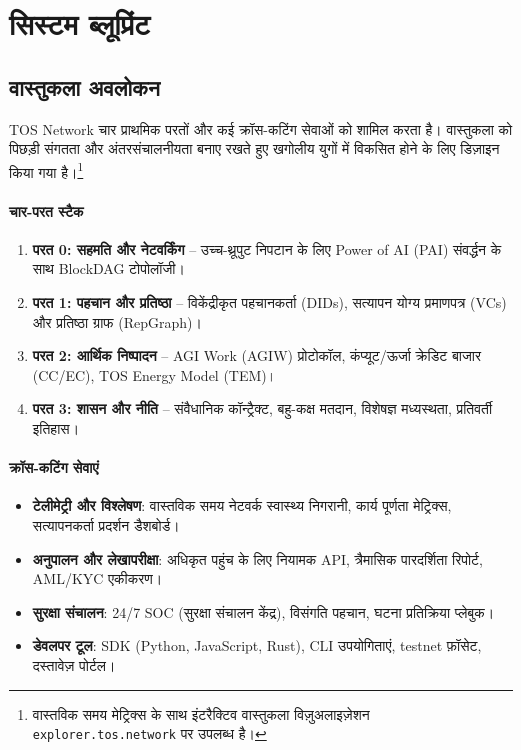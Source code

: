 \documentclass[11pt]{article}
\begin{document}
\section{सिस्टम ब्लूप्रिंट}
\subsection{वास्तुकला अवलोकन}
TOS Network चार प्राथमिक परतों और कई क्रॉस-कटिंग सेवाओं को शामिल करता है। वास्तुकला को पिछड़ी संगतता और अंतरसंचालनीयता बनाए रखते हुए खगोलीय युगों में विकसित होने के लिए डिज़ाइन किया गया है।\footnote{वास्तविक समय मेट्रिक्स के साथ इंटरैक्टिव वास्तुकला विज़ुअलाइज़ेशन \texttt{explorer.tos.network} पर उपलब्ध है।}

\paragraph{चार-परत स्टैक}
\begin{enumerate}[noitemsep]
  \item \textbf{परत 0: सहमति और नेटवर्किंग} -- उच्च-थ्रूपुट निपटान के लिए Power of AI (PAI) संवर्द्धन के साथ BlockDAG टोपोलॉजी।
  \item \textbf{परत 1: पहचान और प्रतिष्ठा} -- विकेंद्रीकृत पहचानकर्ता (DIDs), सत्यापन योग्य प्रमाणपत्र (VCs) और प्रतिष्ठा ग्राफ (RepGraph)।
  \item \textbf{परत 2: आर्थिक निष्पादन} -- AGI Work (AGIW) प्रोटोकॉल, कंप्यूट/ऊर्जा क्रेडिट बाजार (CC/EC), TOS Energy Model (TEM)।
  \item \textbf{परत 3: शासन और नीति} -- संवैधानिक कॉन्ट्रैक्ट, बहु-कक्ष मतदान, विशेषज्ञ मध्यस्थता, प्रतिवर्ती इतिहास।
\end{enumerate}

\paragraph{क्रॉस-कटिंग सेवाएं}
\begin{itemize}[noitemsep]
  \item \textbf{टेलीमेट्री और विश्लेषण}: वास्तविक समय नेटवर्क स्वास्थ्य निगरानी, कार्य पूर्णता मेट्रिक्स, सत्यापनकर्ता प्रदर्शन डैशबोर्ड।
  \item \textbf{अनुपालन और लेखापरीक्षा}: अधिकृत पहुंच के लिए नियामक API, त्रैमासिक पारदर्शिता रिपोर्ट, AML/KYC एकीकरण।
  \item \textbf{सुरक्षा संचालन}: 24/7 SOC (सुरक्षा संचालन केंद्र), विसंगति पहचान, घटना प्रतिक्रिया प्लेबुक।
  \item \textbf{डेवलपर टूल}: SDK (Python, JavaScript, Rust), CLI उपयोगिताएं, testnet फ़ॉसेट, दस्तावेज़ पोर्टल।
\end{itemize}
\end{document}
